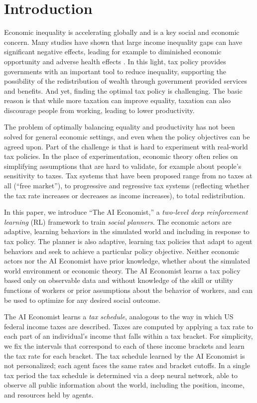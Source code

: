 \section{Introduction}
Economic inequality is accelerating globally and is a key social and economic concern.
Many studies have shown that large income inequality gaps can have significant negative effects,  leading for example to diminished economic opportunity \citep{inequality_matters_2013} and adverse health effects \citep{subramanian2004income}.
In this light, tax policy provides governments with an important tool to reduce inequality, supporting the possibility of the redistribution of wealth through government provided services and benefits.
And yet, finding the optimal tax policy is challenging.
The basic reason is that while more taxation can improve equality, taxation can also discourage people from working, leading to lower productivity.

The problem of optimally balancing equality and productivity has not been solved for general economic settings, and even when the policy objectives can be agreed upon.
Part of the challenge is that is hard to experiment with real-world tax policies.
In the place of experimentation, economic theory often relies on simplifying assumptions that are hard to validate, for example about people’s sensitivity to taxes.
Tax systems that have been proposed range from no taxes at all (“free market”), to progressive and regressive tax systems (reflecting whether the tax rate increases or decreases as income increases), to total redistribution.

In this paper, we introduce “The AI Economist,” a {\em two-level deep reinforcement learning} (RL) framework to train \emph{social planners}. The economic actors are adaptive, learning behaviors in the simulated world and including in response to tax policy. The planner is also adaptive, learning  tax policies that adapt to agent behaviors and seek to achieve a particular policy objective.
Neither economic actors nor the AI Economist have prior knowledge, whether about the simulated world environment or  economic theory.
The AI Economist learns a tax policy based only on observable data and without knowledge of the skill or utility functions of workers or prior assumptions about the behavior of workers, and can be used to optimize for any desired social outcome.

The AI Economist learns a {\em tax schedule}, analogous to the way in which US federal income taxes are described. Taxes are computed by applying a tax rate to each part of an individual's income that falls within a tax bracket.
For simplicity, we fix the intervals that correspond to  each of these income brackets and  learn the tax rate for each bracket.
The tax schedule learned by the AI Economist is not personalized;  each agent faces the same rates and bracket cutoffs. In a single tax period the tax schedule is determined via a deep neural network, able to observe all public information about the world, including the position, income, and resources held by agents.

